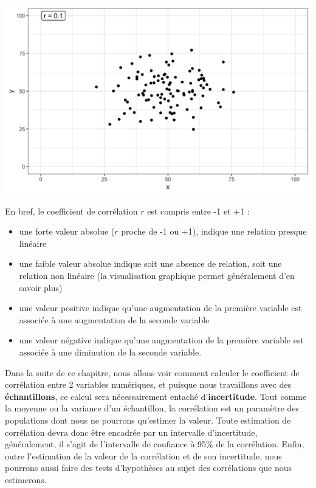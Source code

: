\documentclass[a4paperpaper,]{article}
\providecommand{\tightlist}{%
  \setlength{\itemsep}{0pt}\setlength{\parskip}{0pt}}
\begin{document}
\begin{center}\includegraphics[width=0.9\linewidth]{figure/unnamed-chunk-98-1} \end{center}

En bref, le coefficient de corrélation \(r\) est compris entre -1 et +1 :

\begin{itemize}
\tightlist
\item
  une forte valeur absolue (\(r\) proche de -1 ou +1), indique une relation presque linéaire
\item
  une faible valeur absolue indique soit une absence de relation, soit une relation non linéaire (la visualisation graphique permet généralement d'en savoir plus)
\item
  une valeur positive indique qu'une augmentation de la première variable est associée à une augmentation de la seconde variable
\item
  une valeur négative indique qu'une augmentation de la première variable est associée à une diminution de la seconde variable.
\end{itemize}

Dans la suite de ce chapitre, nous allons voir comment calculer le coefficient de corrélation entre 2 variables numériques, et puisque nous travaillons avec des \textbf{échantillons}, ce calcul sera nécessairement entaché d'\textbf{incertitude}. Tout comme la moyenne ou la variance d'un échantillon, la corrélation est un paramètre des populations dont nous ne pourrons qu'estimer la valeur. Toute estimation de corrélation devra donc être encadrée par un intervalle d'incertitude, généralement, il s'agit de l'intervalle de confiance à 95\% de la corrélation. Enfin, outre l'estimation de la valeur de la corrélation et de son incertitude, nous pourrons aussi faire des tests d'hypothèses au sujet des corrélations que nous estimerons.
\end{document}
